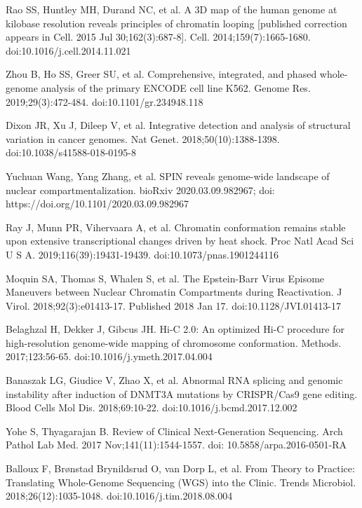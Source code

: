 \documentclass[a4paper,12pt]{article}
\begin{document}
\begin{thebibliography}{100}

Rao SS, Huntley MH, Durand NC, et al. A 3D map of the human genome at kilobase resolution reveals principles of chromatin looping [published correction appears in Cell. 2015 Jul 30;162(3):687-8]. Cell. 2014;159(7):1665-1680. doi:10.1016/j.cell.2014.11.021

Zhou B, Ho SS, Greer SU, et al. Comprehensive, integrated, and phased whole-genome analysis of the primary ENCODE cell line K562. Genome Res. 2019;29(3):472-484. doi:10.1101/gr.234948.118

Dixon JR, Xu J, Dileep V, et al. Integrative detection and analysis of structural variation in cancer genomes. Nat Genet. 2018;50(10):1388-1398. doi:10.1038/s41588-018-0195-8

Yuchuan Wang, Yang Zhang, et al. SPIN reveals genome-wide landscape of nuclear compartmentalization. bioRxiv 2020.03.09.982967; doi: https://doi.org/10.1101/2020.03.09.982967

Ray J, Munn PR, Vihervaara A, et al. Chromatin conformation remains stable upon extensive transcriptional changes driven by heat shock. Proc Natl Acad Sci U S A. 2019;116(39):19431-19439. doi:10.1073/pnas.1901244116

Moquin SA, Thomas S, Whalen S, et al. The Epstein-Barr Virus Episome Maneuvers between Nuclear Chromatin Compartments during Reactivation. J Virol. 2018;92(3):e01413-17. Published 2018 Jan 17. doi:10.1128/JVI.01413-17

Belaghzal H, Dekker J, Gibcus JH. Hi-C 2.0: An optimized Hi-C procedure for high-resolution genome-wide mapping of chromosome conformation. Methods. 2017;123:56-65. doi:10.1016/j.ymeth.2017.04.004

Banaszak LG, Giudice V, Zhao X, et al. Abnormal RNA splicing and genomic instability after induction of DNMT3A mutations by CRISPR/Cas9 gene editing. Blood Cells Mol Dis. 2018;69:10-22. doi:10.1016/j.bcmd.2017.12.002


Yohe S, Thyagarajan B. Review of Clinical Next-Generation Sequencing. Arch Pathol Lab Med. 2017 Nov;141(11):1544-1557. doi: 10.5858/arpa.2016-0501-RA

Balloux F, Brønstad Brynildsrud O, van Dorp L, et al. From Theory to Practice: Translating Whole-Genome Sequencing (WGS) into the Clinic. Trends Microbiol. 2018;26(12):1035-1048. doi:10.1016/j.tim.2018.08.004


\end{thebibliography}
\end{document}
